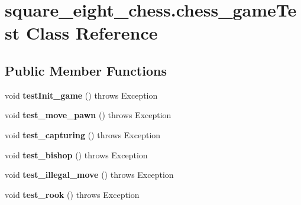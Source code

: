 \hypertarget{classsquare__eight__chess_1_1chess__gameTest}{}\section{square\+\_\+eight\+\_\+chess.\+chess\+\_\+game\+Test Class Reference}
\label{classsquare__eight__chess_1_1chess__gameTest}
\subsection*{Public Member Functions}
\begin{DoxyCompactItemize}
\item 
\hypertarget{classsquare__eight__chess_1_1chess__gameTest_aa466120f1d3931fd2baaa56df8b11cfc}{}void {\bfseries test\+Init\+\_\+game} ()  throws Exception \label{classsquare__eight__chess_1_1chess__gameTest_aa466120f1d3931fd2baaa56df8b11cfc}

\item 
\hypertarget{classsquare__eight__chess_1_1chess__gameTest_a53b86c51b64c5d4653a04d58918a3293}{}void {\bfseries test\+\_\+move\+\_\+pawn} ()  throws Exception \label{classsquare__eight__chess_1_1chess__gameTest_a53b86c51b64c5d4653a04d58918a3293}

\item 
\hypertarget{classsquare__eight__chess_1_1chess__gameTest_a79f78d1f8c78665feae66b947a3687cb}{}void {\bfseries test\+\_\+capturing} ()  throws Exception \label{classsquare__eight__chess_1_1chess__gameTest_a79f78d1f8c78665feae66b947a3687cb}

\item 
\hypertarget{classsquare__eight__chess_1_1chess__gameTest_a8708ed5fc7c5490db86ce20158fca416}{}void {\bfseries test\+\_\+bishop} ()  throws Exception \label{classsquare__eight__chess_1_1chess__gameTest_a8708ed5fc7c5490db86ce20158fca416}

\item 
\hypertarget{classsquare__eight__chess_1_1chess__gameTest_af616e72ebfd8b9ddc5f954a3dbc25786}{}void {\bfseries test\+\_\+illegal\+\_\+move} ()  throws Exception \label{classsquare__eight__chess_1_1chess__gameTest_af616e72ebfd8b9ddc5f954a3dbc25786}

\item 
\hypertarget{classsquare__eight__chess_1_1chess__gameTest_ac7a16595bfb5f4472566a788605e3be1}{}void {\bfseries test\+\_\+rook} ()  throws Exception \label{classsquare__eight__chess_1_1chess__gameTest_ac7a16595bfb5f4472566a788605e3be1}


\end{DoxyCompactItemize}
